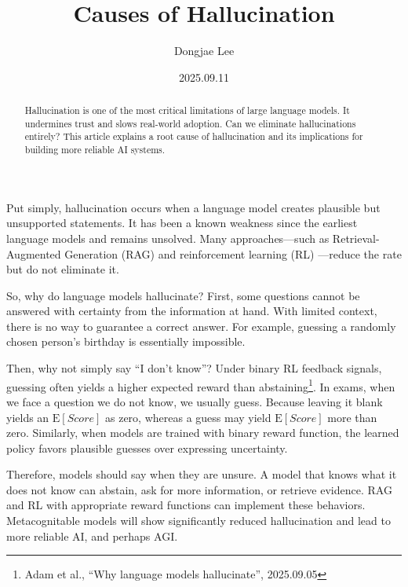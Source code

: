 \documentclass[11pt, oneside]{article}   	%
\title{Causes of Hallucination}
\author{Dongjae Lee}
\date{2025.09.11}
\begin{document}
\maketitle


\begin{abstract}
	Hallucination is one of the most critical limitations of large language models.
	It undermines trust and slows real-world adoption.
	Can we eliminate hallucinations entirely?
	This article explains a root cause of hallucination and its implications for building more reliable AI systems.
\end{abstract}
Put simply, hallucination occurs when a language model creates plausible but unsupported statements.
It has been a known weakness since the earliest language models and remains unsolved.
Many approaches—such as Retrieval-Augmented Generation (RAG) and reinforcement learning (RL) —reduce the rate but do not eliminate it.

So, why do language models hallucinate?
First, some questions cannot be answered with certainty from the information at hand.
With limited context, there is no way to guarantee a correct answer.
For example, guessing a randomly chosen person's birthday is essentially impossible.

Then, why not simply say ``I don't know''?
Under binary RL feedback signals, guessing often yields a higher expected reward than abstaining\footnote{Adam et al., ``Why language models hallucinate'', 2025.09.05}.
In exams, when we face a question we do not know, we usually guess.
Because leaving it blank yields an $\mathrm{E}[Score]$ as zero, whereas a guess may yield $\mathrm{E}[Score]$ more than zero.
Similarly, when models are trained with binary reward function, the learned policy favors plausible guesses over expressing uncertainty.

Therefore, models should say when they are unsure.
A model that knows what it does not know can abstain, ask for more information, or retrieve evidence.
RAG and RL with appropriate reward functions can implement these behaviors.
Metacognitable models will show significantly reduced hallucination and lead to more reliable AI, and perhaps AGI.
\end{document}
